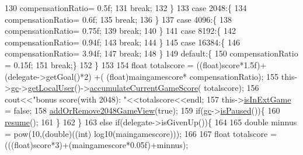 \begin{DoxyCode}
130                     compensationRatio= 0.5f;
131                     \textcolor{keywordflow}{break};
132                 \}
133                 \textcolor{keywordflow}{case} 2048:\{
134                     compensationRatio= 0.6f;
135                     \textcolor{keywordflow}{break};
136                 \}
137                 \textcolor{keywordflow}{case} 4096:\{
138                     compensationRatio= 0.75f;
139                     \textcolor{keywordflow}{break};
140                 \}
141                 \textcolor{keywordflow}{case} 8192:\{
142                     compensationRatio= 0.94f;
143                     \textcolor{keywordflow}{break};
144                 \}
145                 \textcolor{keywordflow}{case} 16384:\{
146                     compensationRatio= 3.94f;
147                     \textcolor{keywordflow}{break};
148                 \}
149                 \textcolor{keywordflow}{default}:\{
150                     compensationRatio = 0.15f;
151                 \textcolor{keywordflow}{break};\}
152             \}
153             
154             \textcolor{keywordtype}{float} totalscore = ((float)score*1.5f)+ (delegate->getGoal()*2) +( (\textcolor{keywordtype}{float})maingamescore*
      compensationRatio);
155             this->\hyperlink{class_hello_world_a547cb213126911d9a7151f8259dc7102}{gc}->\hyperlink{class_tetris_1_1_game_controller_abc67d4b309ce2886b43a3b4e0af22abc}{getLocalUser}()->\hyperlink{class_tetris_1_1_users_1_1_game_user_a5808d26769ba24d9e6435e40d3feb7af}{accumulateCurrentGameScore}(
      totalscore);
156             cout<<\textcolor{stringliteral}{"bonus score(with 2048): "}<<totalscore<<endl;
157             this->\hyperlink{class_hello_world_a6dcd196f83b5eba681717366944fcddf}{isInExtGame} = \textcolor{keyword}{false};
158             \hyperlink{class_hello_world_ad3ea29ba5aa294fc4e4f8ee41833b702}{addOrRemove2048GameView}(\textcolor{keyword}{true});
159             \textcolor{keywordflow}{if}(\hyperlink{class_hello_world_a547cb213126911d9a7151f8259dc7102}{gc}->\hyperlink{class_tetris_1_1_game_controller_a18e513f45750361e14af091704e9f1d4}{isPaused}())\{
160                 \hyperlink{class_hello_world_ad72b45627fe36ea8cd04b9de431edc7f}{resume}();
161             \}
162         \}
163         \textcolor{keywordflow}{else} \textcolor{keywordflow}{if}(delegate->isGivenUp())\{
164             
165             \textcolor{keywordtype}{double} minnus = pow(10,(\textcolor{keywordtype}{double})((\textcolor{keywordtype}{int}) log10(maingamescore)));
166             
167             \textcolor{keywordtype}{float} totalscore =(((float)score*3)+(maingamescore*0.05f)+minnus);

\end{DoxyCode}
